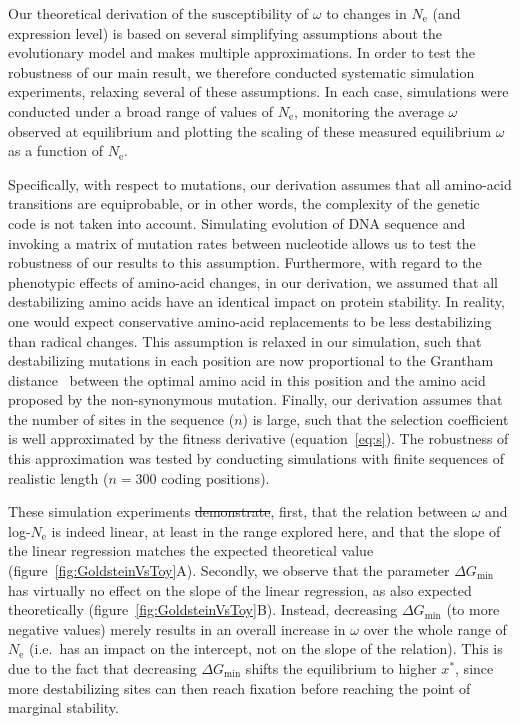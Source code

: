 \documentclass[authoryear]{elsarticle} %
\newcommand{\Ne}{N_{\text{e}}} %
\newcommand{\eq}{^{*}} %
\newcommand{\NbrSites}{n} %
\newcommand{\G}{G} %
\newcommand{\DeltaG}{\Delta \G} %
\newcommand{\EmpiricalDeltaGmin}{\DeltaG_{\text{min}}} %
\providecommand{\DIFaddtex}[1]{{\protect\color{blue}\uwave{#1}}} %
\providecommand{\DIFdeltex}[1]{{\protect\color{red}\sout{#1}}}                      %
\providecommand{\DIFaddbegin}{} %
\providecommand{\DIFaddend}{} %
\providecommand{\DIFdelbegin}{} %
\providecommand{\DIFdelend}{} %
\providecommand{\DIFadd}[1]{\texorpdfstring{\DIFaddtex{#1}}{#1}} %
\providecommand{\DIFdel}[1]{\texorpdfstring{\DIFdeltex{#1}}{}} %
\begin{document}
Our theoretical derivation of the susceptibility of $\omega$ to changes in $\Ne$ (and expression level) is based on several simplifying assumptions about the evolutionary model and makes multiple approximations.
In order to test the robustness of our main result, we therefore conducted systematic simulation experiments, relaxing several of these assumptions.
In each case, simulations were conducted under a broad range of values of $\Ne$, monitoring the average $\omega$ observed at equilibrium and plotting the scaling of these measured equilibrium $\omega$ as a function of $\Ne$.

Specifically, with respect to mutations, our derivation assumes that all amino-acid transitions are equiprobable, or in other words, the complexity of the genetic code is not taken into account.
Simulating evolution of {DNA} sequence and invoking a matrix of mutation rates between nucleotide allows us to test the robustness of our results to this assumption.
Furthermore, with regard to the phenotypic effects of amino-acid changes, in our derivation, we assumed that all destabilizing amino acids have an identical impact on protein stability.
In reality, one would expect conservative amino-acid replacements to be less destabilizing than radical changes.
This assumption is relaxed in our simulation, such that destabilizing mutations in each position are now proportional to the Grantham distance~\citep{Grantham1974} between the optimal amino acid in this position and the amino acid proposed by the {non-synonymous} mutation.
Finally, our derivation assumes that the number of sites in the sequence ($\NbrSites$) is large, such that the selection coefficient is well approximated by the fitness derivative (equation~\ref{eq:s}).
The robustness of this approximation was tested by conducting simulations with finite sequences of realistic length ($\NbrSites=300$ coding positions).

These simulation experiments \DIFdelbegin \DIFdel{demonstrate}\DIFdelend \DIFaddbegin \DIFadd{illustrate}\DIFaddend , first, that the relation between $\omega$ and log-$\Ne$ is indeed linear, at least in the range explored here, and that the slope of the linear regression matches the expected theoretical value (figure~\ref{fig:GoldsteinVsToy}A).
Secondly, we observe that the parameter $\EmpiricalDeltaGmin$ has virtually no effect on the slope of the linear regression, as also expected theoretically (figure~\ref{fig:GoldsteinVsToy}B).
Instead, decreasing $\EmpiricalDeltaGmin$ (to more negative values) merely results in an overall increase in $\omega$ over the whole range of $\Ne$ (i.e.~has an impact on the intercept, not on the slope of the relation).
This is due to the fact that decreasing $\EmpiricalDeltaGmin$ shifts the equilibrium to higher $x\eq$, since more destabilizing sites can then reach fixation before reaching the point of marginal stability.
\end{document}
